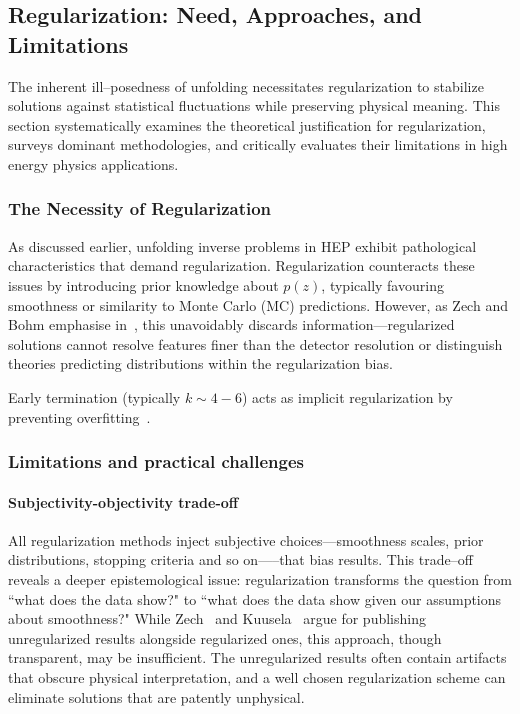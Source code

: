         \subsection{Regularization: Need, Approaches, and Limitations}
        The inherent ill--posedness of unfolding necessitates regularization to stabilize solutions against statistical fluctuations while preserving physical meaning.
        This section systematically examines the theoretical justification for regularization, surveys dominant methodologies, and critically evaluates their limitations in high energy physics applications.
        
        \subsubsection{The Necessity of Regularization}  
         As discussed earlier, unfolding inverse problems in HEP exhibit pathological characteristics that demand regularization.
        Regularization counteracts these issues by introducing prior knowledge about \(p(z)\), typically favouring smoothness or similarity to Monte Carlo (MC) predictions.
        However, as Zech and Bohm emphasise in~\cite{Bohm2025IntroductionPhysicists}, this unavoidably discards information---regularized solutions cannot resolve features finer than the detector resolution or distinguish theories predicting distributions within the regularization bias.
        
        Early termination (typically \(k \sim 4-6\)) acts as implicit regularization by preventing overfitting~\cite{multhei_iterative_1987}.

    \subsubsection{Limitations and practical challenges}  
        \paragraph{Subjectivity-objectivity trade-off}  
            All regularization methods inject subjective choices---smoothness scales, prior distributions, stopping criteria and so on—--that bias results.
            This trade--off reveals a deeper epistemological issue: regularization transforms the question from ``what does the data show?" to ``what does the data show given our assumptions about smoothness?"
            While Zech~\cite{zech_regularization_2011} and Kuusela~\cite{kuusela_uncertainty_2016} argue for publishing unregularized results alongside regularized ones, this approach, though transparent, may be insufficient.
            The unregularized results often contain artifacts that obscure physical interpretation, and a well chosen regularization scheme can eliminate solutions that are patently unphysical.
            

